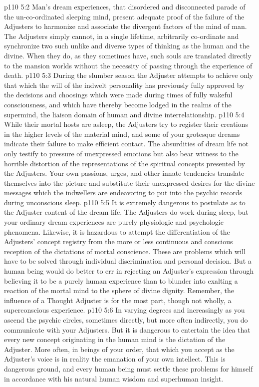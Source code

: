 \pc \vs p110 5:2 Man’s dream experiences, that disordered and disconnected parade of the un\hyp{}co\hyp{}ordinated sleeping mind, present adequate proof of the failure of the Adjusters to harmonize and associate the divergent factors of the mind of man. The Adjusters simply cannot, in a single lifetime, arbitrarily co\hyp{}ordinate and synchronize two such unlike and diverse types of thinking as the human and the divine. When they do, as they sometimes have, such souls are translated directly to the mansion worlds without the necessity of passing through the experience of death.
\vs p110 5:3 During the slumber season the Adjuster attempts to achieve only that which the will of the indwelt personality has previously fully approved by the decisions and choosings which were made during times of fully wakeful consciousness, and which have thereby become lodged in the realms of the supermind, the liaison domain of human and divine interrelationship.
\vs p110 5:4 While their mortal hosts are asleep, the Adjusters try to register their creations in the higher levels of the material mind, and some of your grotesque dreams indicate their failure to make efficient contact. The absurdities of dream life not only testify to pressure of unexpressed emotions but also bear witness to the horrible distortion of the representations of the spiritual concepts presented by the Adjusters. Your own passions, urges, and other innate tendencies translate themselves into the picture and substitute their unexpressed desires for the divine messages which the indwellers are endeavoring to put into the psychic records during unconscious sleep.
\vs p110 5:5 It is extremely dangerous to postulate as to the Adjuster content of the dream life. The Adjusters do work during sleep, but your ordinary dream experiences are purely physiologic and psychologic phenomena. Likewise, it is hazardous to attempt the differentiation of the Adjusters’ concept registry from the more or less continuous and conscious reception of the dictations of mortal conscience. These are problems which will have to be solved through individual discrimination and personal decision. But a human being would do better to err in rejecting an Adjuster’s expression through believing it to be a purely human experience than to blunder into exalting a reaction of the mortal mind to the sphere of divine dignity. Remember, the influence of a Thought Adjuster is for the most part, though not wholly, a superconscious experience.
\vs p110 5:6 In varying degrees and increasingly as you ascend the psychic circles, sometimes directly, but more often indirectly, you do communicate with your Adjusters. But it is dangerous to entertain the idea that every new concept originating in the human mind is the dictation of the Adjuster. More often, in beings of your order, that which you accept as the Adjuster’s voice is in reality the emanation of your own intellect. This is dangerous ground, and every human being must settle these problems for himself in accordance with his natural human wisdom and superhuman insight.\plusone
